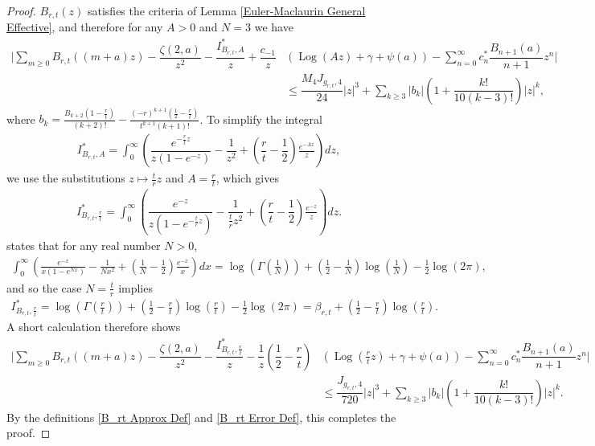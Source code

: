 \documentclass[11pt,reqno]{amsart}
\theoremstyle{definition}
\theoremstyle{plain}
\theoremstyle{named}
\DeclareMathOperator\Log{Log}
\numberwithin{equation}{section}
\theoremstyle{example}
\def\lp{\left(}
\def\rp{\right)}
\begin{document}
\begin{proof}
$B_{r,t}(z)$ satisfies the criteria of Lemma \ref{Euler-Maclaurin General Effective}, and therefore for any $A > 0$ and $N = 3$ we have
\begin{align*}
    \bigg| \sum_{m \geq 0} B_{r,t}\lp (m+a)z \rp - \dfrac{\zeta(2,a)}{z^2} - \dfrac{I_{B_{r,t},A}^*}{z} + \dfrac{c_{-1}}{z}&\lp \Log(Az) + \gamma + \psi(a) \rp - \sum_{n = 0}^\infty c_n^* \dfrac{B_{n+1}(a)}{n+1} z^n \bigg| \\ &\leq \dfrac{M_4 J_{g_{r,t},4}}{24} |z|^3 + \sum_{k \geq 3} |b_k| \lp 1 + \dfrac{k!}{10(k-3)!} \rp |z|^k,
\end{align*}
where $b_k = \frac{B_{k+2}\lp 1 - \frac rt \rp}{(k+2)!} - \frac{\lp -r \rp^{k+1} \lp \frac 12 - \frac rt \rp}{t^{k+1} (k+1)!}$. To simplify the integral
\begin{align*}
    I_{B_{r,t},A}^* = \int_{0}^\infty \left(\dfrac{e^{-\frac rt z}}{z\lp 1 - e^{-z} \rp} - \dfrac{1}{z^2} + \lp \dfrac{r}{t} - \dfrac{1}{2} \rp \frac{e^{-Az}}{z} \right) dz,
\end{align*}
we use the substitutions $z \mapsto \frac{t}{r} z$ and $A = \frac{r}{t}$, which gives
\begin{align*}
    I_{B_{r,t},\frac{r}{t}}^* = \int_{0}^\infty \left(\dfrac{e^{-z}}{z \lp 1 - e^{- \frac{t}{r} z} \rp} - \dfrac{1}{\frac{t}{r} z^2} + \lp \dfrac{r}{t} - \dfrac{1}{2} \rp \frac{e^{-z}}{z} \right) dz.
\end{align*}
\cite[Lemma 2.3]{BCMO} states that for any real number $N > 0$,
\begin{multline*}
\int_0^\infty\left(\frac{e^{-x}}{x\left(1-e^{Nx}\right)}-\frac{1}{Nx^2}+\left(\frac 1N-\frac 12\right)\frac{e^{-x}}{x} \right)dx
=\log\left(\Gamma\left(\frac 1N\right) \right) +\left(\frac 12-\frac 1N\right) \log\left(\frac 1N\right)-\frac 12\log(2\pi),
\end{multline*}
and so the case $N = \frac tr$ implies
\begin{align*}
    I_{B_{r,t},\frac rt}^* = \log\left(\Gamma\left(\frac rt\right) \right) +\left(\frac 12-\frac rt\right) \log\left(\frac rt\right)-\frac 12\log(2\pi) = \beta_{r,t} + \left(\frac 12-\frac rt\right) \log\left(\frac rt\right).
\end{align*}
A short calculation therefore shows
\begin{align*}
    \bigg| \sum_{m \geq 0} B_{r,t}\lp (m+a)z \rp - \dfrac{\zeta(2,a)}{z^2} - \dfrac{I^*_{B_{r,t},\frac rt}}{z} - \dfrac{1}{z}\lp \dfrac{1}{2} - \dfrac{r}{t} \rp & \lp \Log\lp\frac{r}{t} z\rp + \gamma + \psi(a) \rp - \sum_{n = 0}^\infty c_n^* \dfrac{B_{n+1}(a)}{n+1} z^n \bigg| \\ &\leq \dfrac{J_{g_{r,t},4}}{720} |z|^3 + \sum_{k \geq 3} |b_k| \lp 1 + \dfrac{k!}{10(k-3)!} \rp |z|^k.
\end{align*}
By the definitions \eqref{B_rt Approx Def} and \eqref{B_rt Error Def}, this completes the proof.
\end{proof}
\end{document}
